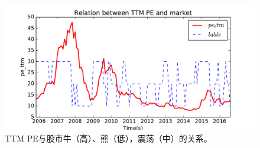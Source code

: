 \documentclass[10pt,a4paper]{article}
\begin{document}
\begin{figure}[t]
	\centering
	\includegraphics[width=0.9\linewidth]{PE.pdf}
	\caption{TTM PE与股市牛（高）、熊（低），震荡（中）的关系。}
	\label{fig4}
\end{figure}
\end{document}

